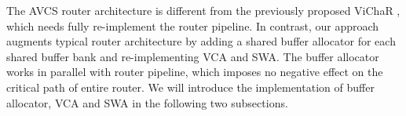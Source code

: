 \documentclass[10pt,conference]{IEEEtran}
\begin{document}
The AVCS router architecture is different from the previously proposed ViChaR \cite{NPKV06}, which needs fully re-implement the router pipeline. In contrast, our approach augments typical router architecture \cite{DaTo01} by adding a shared buffer allocator for each shared buffer bank and re-implementing VCA and SWA. The buffer allocator works in parallel with router pipeline, which imposes no negative effect on the critical path of entire router. We will introduce the implementation of buffer allocator, VCA and SWA in the following two subsections.

\end{document}
